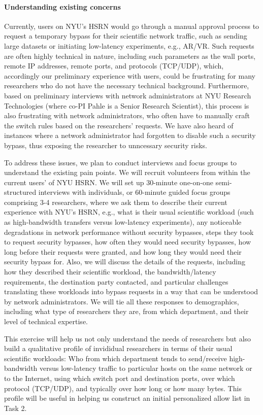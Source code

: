 \paragraph{Understanding existing concerns}
Currently, users on NYU's HSRN would go through a manual approval process to request a temporary bypass for their scientific network traffic, such as sending large datasets or initiating low-latency experiments, e.g., AR/VR. Such requests are often highly technical in nature, including such parameters as the wall ports, remote IP addresses, remote ports, and protocols (TCP/UDP), which, accordingly our preliminary experience with users, could be frustrating for many researchers who do not have the necessary technical background. Furthermore, based on preliminary interviews with network administrators at NYU Research Technologies (where co-PI Pahle is a Senior Research Scientist), this process is also frustrating with network administrators, who often have to manually craft the switch rules based on the researchers' requests. We have also heard of instances where a network administrator had forgotten to disable such a security bypass, thus exposing the researcher to unncessary security risks.

To address these issues, we plan to conduct interviews and focus groups to understand the existing pain points. We will recruit volunteers from within the current users' of NYU HSRN. We will set up 30-minute one-on-one semi-structured interviews with individuals, or 60-minute guided focus groups comprising 3-4 researchers, where we ask them to describe their current experience with NYU's HSRN, e.g., what is their usual scientific workload (such as high-bandwidth transfers versus low-latency experiments), any noticeable degradations in network performance without security bypasses, steps they took to request security bypasses, how often they would need security bypasses, how long before their requests were granted, and how long they would need their security bypass for. Also, we will discuss the details of the requests, including how they described their scientific workload, the bandwidth/latency requirements, the destination party contacted, and particular challenges translating these workloads into bypass requests in a way that can be understood by network administrators. We will tie all these responses to demographics, including what type of researchers they are, from which department, and their level of technical expertise.

This exercise will help us not only understand the needs of researchers but also build a qualitative profile of invididual researchers in terms of their usual scientific workloads: Who from which department tends to send/receive high-bandwidth versus low-latency traffic to particular hosts on the same network or to the Internet, using which switch port and destination ports, over which protocol (TCP/UDP), and typically over how long or how many bytes. This profile will be useful in helping us construct an initial personalized allow list in Task 2.


